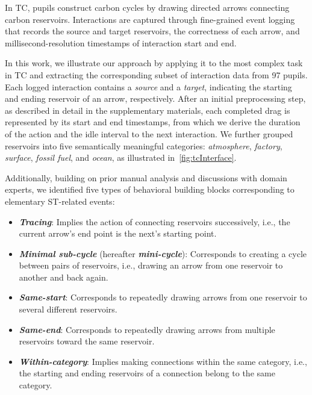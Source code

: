 \documentclass[letterpaper,journal]{IEEEtran}
\begin{document}
In TC, pupils construct carbon cycles by drawing directed arrows connecting carbon reservoirs.
Interactions are captured through fine-grained event logging that records the source and target reservoirs, the correctness of each arrow, and millisecond-resolution timestamps of interaction start and end. 

In this work, we illustrate our approach by applying it to the most complex task in TC and extracting the corresponding subset of interaction data from 97 pupils.
Each logged interaction contains a \textit{source} and a \textit{target}, indicating the starting and ending reservoir of an arrow, respectively. 
After an initial preprocessing step, as described in detail in the supplementary materials, each completed drag is represented by its start and end timestamps, from which we derive the duration of the action and the idle interval to the next interaction. 
We further grouped reservoirs into five semantically meaningful categories: \textit{atmosphere}, \textit{factory}, \textit{surface}, \textit{fossil fuel}, and \textit{ocean}, as illustrated in~\cref{fig:tcInterface}.

Additionally, building on prior manual analysis and discussions with domain experts, we identified five types of behavioral building blocks corresponding to elementary ST-related events:
\begin{itemize}[nosep]
  \item 
  \textbf{\textit{Tracing}}: Implies the action of connecting reservoirs successively, i.e., the current arrow's end point is the next's starting point.
  
  \item 
  \textbf{\textit{Minimal sub-cycle}} (hereafter \textbf{\textit{mini-cycle}}): Corresponds to creating a cycle between pairs of reservoirs, i.e., drawing an arrow from one reservoir to another and back again.

  \item 
  \textbf{\textit{Same-start}}: Corresponds to repeatedly drawing arrows from one reservoir to several different reservoirs.
  
  \item 
  \textbf{\textit{Same-end}}: Corresponds to repeatedly drawing arrows from multiple reservoirs toward the same reservoir.
  
  \item 
  \textbf{\textit{Within-category}}: Implies making connections within the same category, i.e., the starting and ending reservoirs of a connection belong to the same category.
\end{itemize}
\end{document}
